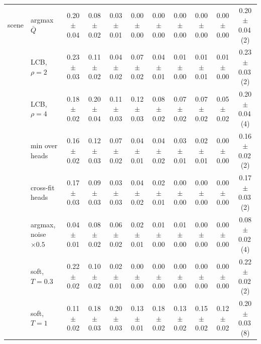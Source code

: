\begin{tabular}{ll cccccccc c}
\midrule
scene & argmax $\bar Q$ & 0.20{\scriptsize$\pm$0.04} & 0.08{\scriptsize$\pm$0.02} & 0.03{\scriptsize$\pm$0.01} & 0.00{\scriptsize$\pm$0.00} & 0.00{\scriptsize$\pm$0.00} & 0.00{\scriptsize$\pm$0.00} & 0.00{\scriptsize$\pm$0.00} & 0.00{\scriptsize$\pm$0.00} & 0.20{\scriptsize$\pm$0.04}\,(2) \\
 & LCB, $\rho{=}2$ & 0.23{\scriptsize$\pm$0.03} & 0.11{\scriptsize$\pm$0.02} & 0.04{\scriptsize$\pm$0.02} & 0.07{\scriptsize$\pm$0.02} & 0.04{\scriptsize$\pm$0.01} & 0.01{\scriptsize$\pm$0.00} & 0.01{\scriptsize$\pm$0.01} & 0.01{\scriptsize$\pm$0.00} & 0.23{\scriptsize$\pm$0.03}\,(2) \\
 & LCB, $\rho{=}4$ & 0.18{\scriptsize$\pm$0.02} & 0.20{\scriptsize$\pm$0.04} & 0.11{\scriptsize$\pm$0.03} & 0.12{\scriptsize$\pm$0.03} & 0.08{\scriptsize$\pm$0.02} & 0.07{\scriptsize$\pm$0.02} & 0.07{\scriptsize$\pm$0.02} & 0.05{\scriptsize$\pm$0.02} & 0.20{\scriptsize$\pm$0.04}\,(4) \\
 & min over heads & 0.16{\scriptsize$\pm$0.02} & 0.12{\scriptsize$\pm$0.03} & 0.07{\scriptsize$\pm$0.02} & 0.04{\scriptsize$\pm$0.01} & 0.04{\scriptsize$\pm$0.02} & 0.03{\scriptsize$\pm$0.01} & 0.02{\scriptsize$\pm$0.01} & 0.00{\scriptsize$\pm$0.00} & 0.16{\scriptsize$\pm$0.02}\,(2) \\
 & cross-fit heads & 0.17{\scriptsize$\pm$0.03} & 0.09{\scriptsize$\pm$0.03} & 0.03{\scriptsize$\pm$0.03} & 0.04{\scriptsize$\pm$0.02} & 0.02{\scriptsize$\pm$0.01} & 0.00{\scriptsize$\pm$0.00} & 0.00{\scriptsize$\pm$0.00} & 0.00{\scriptsize$\pm$0.00} & 0.17{\scriptsize$\pm$0.03}\,(2) \\
 & argmax, noise $\times 0.5$ & 0.04{\scriptsize$\pm$0.01} & 0.08{\scriptsize$\pm$0.02} & 0.06{\scriptsize$\pm$0.02} & 0.02{\scriptsize$\pm$0.01} & 0.01{\scriptsize$\pm$0.00} & 0.01{\scriptsize$\pm$0.00} & 0.00{\scriptsize$\pm$0.00} & 0.00{\scriptsize$\pm$0.00} & 0.08{\scriptsize$\pm$0.02}\,(4) \\
 & soft, $T{=}0.3$ & 0.22{\scriptsize$\pm$0.02} & 0.10{\scriptsize$\pm$0.02} & 0.02{\scriptsize$\pm$0.01} & 0.00{\scriptsize$\pm$0.00} & 0.00{\scriptsize$\pm$0.00} & 0.00{\scriptsize$\pm$0.00} & 0.00{\scriptsize$\pm$0.00} & 0.00{\scriptsize$\pm$0.00} & 0.22{\scriptsize$\pm$0.02}\,(2) \\
 & soft, $T{=}1$ & 0.11{\scriptsize$\pm$0.02} & 0.18{\scriptsize$\pm$0.03} & 0.20{\scriptsize$\pm$0.03} & 0.13{\scriptsize$\pm$0.01} & 0.18{\scriptsize$\pm$0.02} & 0.13{\scriptsize$\pm$0.02} & 0.15{\scriptsize$\pm$0.02} & 0.12{\scriptsize$\pm$0.02} & 0.20{\scriptsize$\pm$0.03}\,(8) \\
\bottomrule
\end{tabular}
